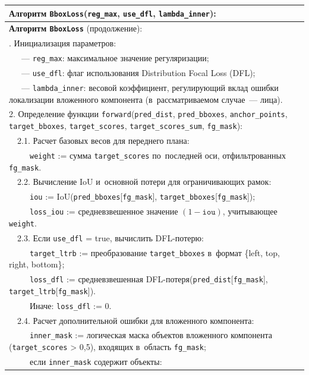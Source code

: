 \begin{longtable}{@{}p{}@{}}
\hline
\textbf{Алгоритм \texttt{BboxLoss}}(\texttt{reg\_max}, \texttt{use\_dfl}, \texttt{lambda\_inner}):\\
\hline
\endfirsthead
\hline
\textbf{Алгоритм \texttt{BboxLoss}} (продолжение):\\
\hline
\endhead
\hline
\endfoot
1. Инициализация параметров:\\
~~~--- \texttt{reg\_max}: максимальное значение регуляризации;\\
~~~--- \texttt{use\_dfl}: флаг использования Distribution Focal Loss (DFL);\\
~~~--- \texttt{lambda\_inner}: весовой коэффициент, регулирующий вклад ошибки локализации вложенного компонента (в~рассматриваемом случае~--- лица).\\
2. Определение функции \texttt{forward}(\texttt{pred\_dist}, \texttt{pred\_bboxes}, \texttt{anchor\_points}, \texttt{target\_bboxes}, \texttt{target\_scores}, \texttt{target\_scores\_sum}, \texttt{fg\_mask}):\\
~~2.1. Расчет базовых весов для переднего плана:\\
~~~~~\texttt{weight} := сумма \texttt{target\_scores} по~последней оси, отфильтрованных \texttt{fg\_mask}.\\
~~2.2. Вычисление IoU и~основной потери для ограничивающих рамок:\\
~~~~~\texttt{iou} := IoU(\texttt{pred\_bboxes}[\texttt{fg\_mask}], \texttt{target\_bboxes}[\texttt{fg\_mask}]);\\
~~~~~\texttt{loss\_iou} := средневзвешенное значение $(1-\texttt{iou})$, учитывающее \texttt{weight}.\\
~~2.3. Если \texttt{use\_dfl} = true, вычислить DFL-потерю:\\
~~~~~\texttt{target\_ltrb} := преобразование \texttt{target\_bboxes} в~формат \{left, top, right, bottom\};\\
~~~~~\texttt{loss\_dfl} := средневзвешенная DFL-потеря(\texttt{pred\_dist}[\texttt{fg\_mask}], \texttt{target\_ltrb}[\texttt{fg\_mask}]).\\
~~~~~Иначе: \texttt{loss\_dfl} := 0.\\
~~2.4. Расчет дополнительной ошибки для вложенного компонента:\\
~~~~~\texttt{inner\_mask} := логическая маска объектов вложенного компонента (\texttt{target\_scores} > 0,5), входящих в~область \texttt{fg\_mask};\\
~~~~~если \texttt{inner\_mask} содержит объекты:\\

\end{longtable}
